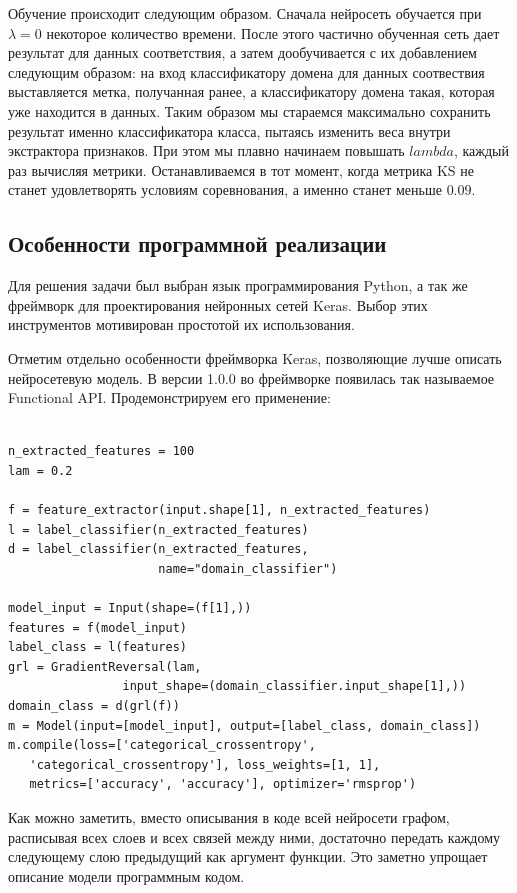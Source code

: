 \documentclass[14pt, a4paper]{extarticle}
\begin{document}
Обучение происходит следующим образом.
Сначала нейросеть обучается при $\lambda = 0$ некоторое количество времени. После этого частично обученная сеть дает результат для данных соответствия, а затем дообучивается с их добавлением следующим образом: на вход классификатору домена для данных соотвествия выставляется метка, получанная ранее, а классификатору домена такая, которая уже находится в данных. Таким образом мы стараемся максимально сохранить результат именно классификатора класса, пытаясь изменить веса внутри экстрактора признаков. При этом мы плавно начинаем повышать $lambda$, каждый раз вычисляя метрики. Останавливаемся в тот момент, когда метрика KS не станет удовлетворять условиям соревнования, а именно станет меньше $0.09$. 

\subsection{Особенности программной реализации}
Для решения задачи был выбран язык программирования Python, а так же фреймворк для проектирования нейронных сетей Keras. Выбор этих инструментов мотивирован простотой их использования.

Отметим отдельно особенности фреймворка Keras, позволяющие лучше описать нейросетевую модель. В версии 1.0.0 во фреймворке появилась так называемое Functional API. Продемонстрируем его применение:

\begin{verbatim}

n_extracted_features = 100
lam = 0.2

f = feature_extractor(input.shape[1], n_extracted_features)
l = label_classifier(n_extracted_features)
d = label_classifier(n_extracted_features,
                     name="domain_classifier")
	                     
model_input = Input(shape=(f[1],))
features = f(model_input)
label_class = l(features)
grl = GradientReversal(lam, 
                input_shape=(domain_classifier.input_shape[1],))
domain_class = d(grl(f))
m = Model(input=[model_input], output=[label_class, domain_class])
m.compile(loss=['categorical_crossentropy',
   'categorical_crossentropy'], loss_weights=[1, 1],
   metrics=['accuracy', 'accuracy'], optimizer='rmsprop') 
\end{verbatim}

Как можно заметить, вместо описывания в коде всей нейросети графом, расписывая всех слоев и всех связей между ними, достаточно передать каждому следующему слою предыдущий как аргумент функции. Это заметно упрощает описание модели программным кодом.
\end{document}

